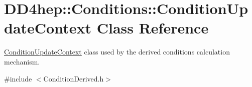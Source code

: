 \hypertarget{class_d_d4hep_1_1_conditions_1_1_condition_update_context}{}\section{D\+D4hep\+:\+:Conditions\+:\+:Condition\+Update\+Context Class Reference}
\label{class_d_d4hep_1_1_conditions_1_1_condition_update_context}


\hyperlink{class_d_d4hep_1_1_conditions_1_1_condition_update_context}{Condition\+Update\+Context} class used by the derived conditions calculation mechanism.  




{\ttfamily \#include $<$Condition\+Derived.\+h$>$}

